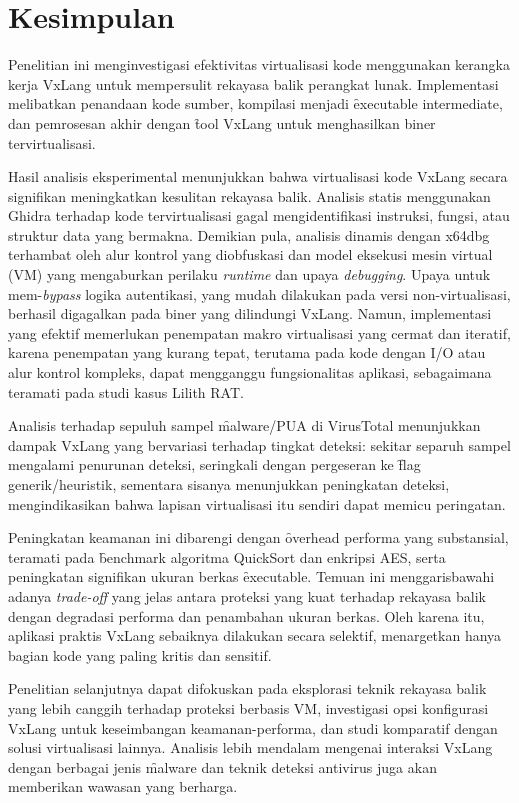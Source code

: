 \section{Kesimpulan}
\label{sec:kesimpulan_jurnal_ui_ana_ringkas}

Penelitian ini menginvestigasi efektivitas virtualisasi kode menggunakan kerangka kerja VxLang untuk mempersulit rekayasa balik perangkat lunak. Implementasi melibatkan penandaan kode sumber, kompilasi menjadi \f{executable intermediate}, dan pemrosesan akhir dengan \f{tool} VxLang untuk menghasilkan biner tervirtualisasi.

Hasil analisis eksperimental menunjukkan bahwa virtualisasi kode VxLang secara signifikan meningkatkan kesulitan rekayasa balik. Analisis statis menggunakan Ghidra terhadap kode tervirtualisasi gagal mengidentifikasi instruksi, fungsi, atau struktur data yang bermakna. Demikian pula, analisis dinamis dengan x64dbg terhambat oleh alur kontrol yang diobfuskasi dan model eksekusi mesin virtual (VM) yang mengaburkan perilaku \textit{runtime} dan upaya \textit{debugging}. Upaya untuk mem-\textit{bypass} logika autentikasi, yang mudah dilakukan pada versi non-virtualisasi, berhasil digagalkan pada biner yang dilindungi VxLang. Namun, implementasi yang efektif memerlukan penempatan makro virtualisasi yang cermat dan iteratif, karena penempatan yang kurang tepat, terutama pada kode dengan I/O atau alur kontrol kompleks, dapat mengganggu fungsionalitas aplikasi, sebagaimana teramati pada studi kasus Lilith RAT.

Analisis terhadap sepuluh sampel \f{malware}/PUA di VirusTotal menunjukkan dampak VxLang yang bervariasi terhadap tingkat deteksi: sekitar separuh sampel mengalami penurunan deteksi, seringkali dengan pergeseran ke \f{flag} generik/heuristik, sementara sisanya menunjukkan peningkatan deteksi, mengindikasikan bahwa lapisan virtualisasi itu sendiri dapat memicu peringatan.

Peningkatan keamanan ini dibarengi dengan \f{overhead} performa yang substansial, teramati pada \f{benchmark} algoritma QuickSort dan enkripsi AES, serta peningkatan signifikan ukuran berkas \f{executable}. Temuan ini menggarisbawahi adanya \textit{trade-off} yang jelas antara proteksi yang kuat terhadap rekayasa balik dengan degradasi performa dan penambahan ukuran berkas. Oleh karena itu, aplikasi praktis VxLang sebaiknya dilakukan secara selektif, menargetkan hanya bagian kode yang paling kritis dan sensitif.

Penelitian selanjutnya dapat difokuskan pada eksplorasi teknik rekayasa balik yang lebih canggih terhadap proteksi berbasis VM, investigasi opsi konfigurasi VxLang untuk keseimbangan keamanan-performa, dan studi komparatif dengan solusi virtualisasi lainnya. Analisis lebih mendalam mengenai interaksi VxLang dengan berbagai jenis \f{malware} dan teknik deteksi antivirus juga akan memberikan wawasan yang berharga.
